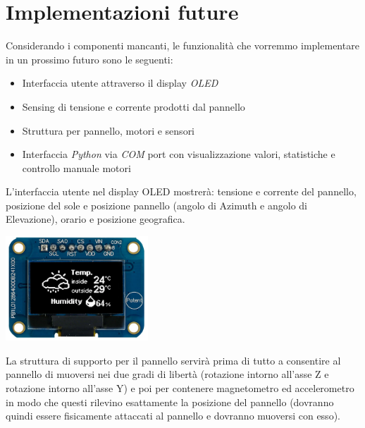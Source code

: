\chapter{Implementazioni future}

Considerando i componenti mancanti, le funzionalità che vorremmo
implementare in un prossimo futuro sono le seguenti:

\begin{itemize}
\item Interfaccia utente attraverso il display \textit{OLED}
\item Sensing di tensione e corrente prodotti dal pannello
\item Struttura per pannello, motori e sensori
\item Interfaccia \textit{Python} via \textit{COM} port con visualizzazione valori, statistiche e controllo manuale motori
\end{itemize}

\noindent L'interfaccia utente nel display OLED mostrerà: tensione e
corrente del pannello, posizione del sole e posizione pannello (angolo di
Azimuth e angolo di Elevazione), orario e posizione geografica.

\begin{center}
\includegraphics[width=0.4\textwidth]{figures/image27.png}
\captionsetup{type=figure}
\end{center}

\noindent La struttura di supporto per il pannello servirà prima di tutto a
consentire al pannello di muoversi nei due gradi di libertà (rotazione
intorno all'asse Z e rotazione intorno all'asse Y) e poi per contenere
magnetometro ed accelerometro in modo che questi rilevino esattamente la
posizione del pannello (dovranno quindi essere fisicamente attaccati al
pannello e dovranno muoversi con esso).


